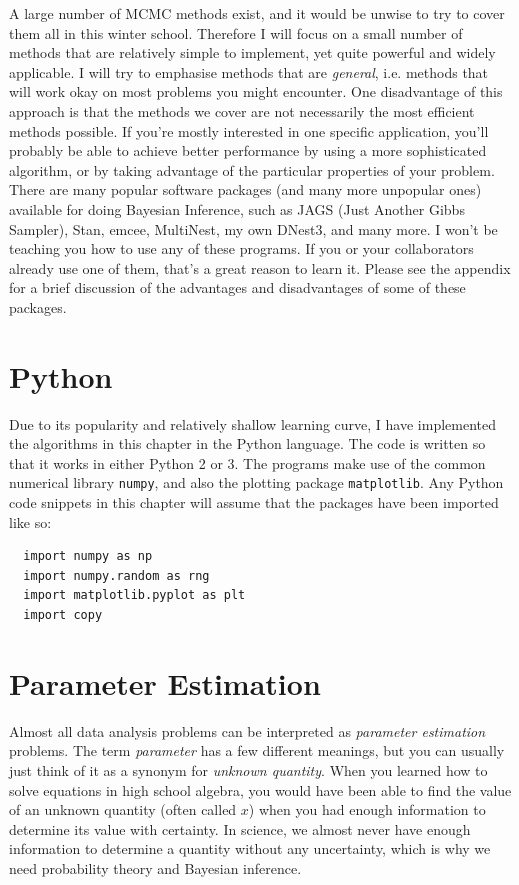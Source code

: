 A large number of MCMC methods exist, and it would be
unwise to try to cover them all in this winter school. Therefore I will focus
on a small number of methods that are relatively simple to implement, yet quite powerful
and widely applicable. I will try to emphasise methods that are {\it general},
i.e. methods that will work okay on most problems you might encounter. One
disadvantage of this approach is that the methods we cover are not necessarily
the most efficient methods possible. If you're mostly interested in one
specific application, you'll probably be able to achieve better performance
by using a more sophisticated algorithm, or by taking advantage of the particular
properties of your problem.
There are many popular software packages (and many more unpopular ones)
available for doing Bayesian Inference, such as JAGS (Just Another Gibbs Sampler),
Stan, emcee, MultiNest, my own DNest3, and many more.
I won't be teaching you how to use any of these programs.
If you or your collaborators already use one of them, that's a great reason to
learn it. Please see the appendix for a brief discussion of the advantages and
disadvantages of some of these packages.


\section{Python}
Due to its popularity and relatively shallow learning curve,
I have implemented the algorithms in this chapter in the Python language.
The code is written so that it works in either Python 2 or 3.
The programs make use of the common numerical library {\tt numpy}, and also
the plotting package {\tt matplotlib}. Any Python code snippets in this chapter
will assume that the packages have been imported like so:

\begin{verbatim}
  import numpy as np
  import numpy.random as rng
  import matplotlib.pyplot as plt
  import copy
\end{verbatim}



\section{Parameter Estimation}
Almost all data analysis problems can be interpreted as {\it parameter
estimation} problems. The term {\it parameter} has a few different meanings,
but you can usually just think of it as a synonym for {\it unknown quantity}.
When you learned how to solve equations in high school algebra,
you would have been able to find the value of an unknown quantity
(often called $x$) when you had
enough information to determine its value with certainty.
In science, we almost never have enough information to determine a quantity
without any uncertainty, which is why we need probability theory and Bayesian
inference.

